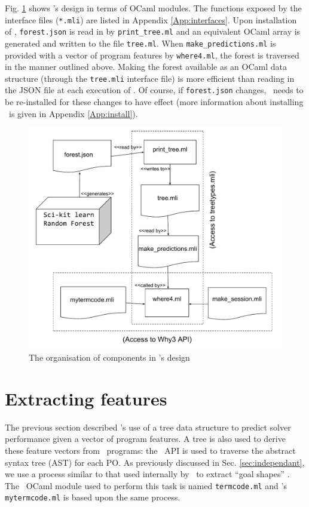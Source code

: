 \sloppypar
Fig. \ref{fig:Chapter5} shows \where's design in terms of OCaml modules.
The functions exposed by the interface files (\texttt{*.mli}) are listed in Appendix \ref{App:interfaces}. 
Upon installation of \where, \texttt{forest.json} is read in by \texttt{print\_tree.ml} and an equivalent OCaml array is generated and written to the file \texttt{tree.ml}.
When \texttt{make\_predictions.ml} is provided with a vector of program features by \texttt{where4.ml}, the forest is traversed  in the manner outlined above.
Making the forest available as an OCaml data structure (through the \texttt{tree.mli} interface file) is more efficient than reading in the JSON file at each execution of \where.
Of course, if \texttt{forest.json} changes, \where~needs to be re-installed for these changes to have effect (more information about installing \where~is given in Appendix \ref{App:install}).  


\begin{figure}
	\centering
	\includegraphics[width=1.0\linewidth]{Figures/Chapter5_stereo}
	\caption[\where~modules]{The organisation of components in \where's design}
	\label{fig:Chapter5}
\end{figure}

\section{Extracting features}

The previous section described \where's use of a tree data structure to predict solver performance given a vector of program features.
A tree is also used to derive these feature vectors from \why~programs: the \why~API is used to traverse the abstract syntax tree (AST) for each PO.
As previously discussed in Sec. \ref{sec:independant}, we use a process similar to that used internally by \why~to extract ``goal shapes'' \cite{why:preserving}.
The \why~OCaml module used to perform this task is named \texttt{termcode.ml} and \where's \texttt{mytermcode.ml} is based upon the same process.

